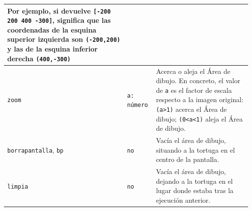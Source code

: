 \begin{center}
\begin{longtable}{|m{3.5cm}|m{3cm}|m{8.5cm}|}
        Por ejemplo, si devuelve \texttt{[-200 200 400 -300]}, significa que
        las coordenadas de la esquina superior izquierda son \texttt{(-200,200)}
        y las de la esquina inferior derecha \texttt{(400,-300)}\\ \hline 
   \texttt{zoom} \index{zoom@\texttt{zoom}} &
      \texttt{a: n\'umero} &
        Acerca o aleja el \'Area de dibujo. En concreto, el valor de \texttt{a}
        es el factor de escala respecto a la imagen original:
        \texttt{(a>1)} acerca el \'Area de dibujo;  
        \texttt{(0<a<1)} aleja el \'Area de dibujo. \\ \hline
   \texttt{borrapantalla}, \index{borrapantalla@\texttt{borrapantalla}}
     \texttt{bp} \index{bp@\texttt{bp}} & \texttt{no} &
        Vac\'ia el \'area de dibujo, situando a la tortuga en el centro de
        la pantalla. \\ \hline 
   \texttt{limpia} \index{limpia@\texttt{limpia}} & \texttt{no} &
        Vac\'ia el \'area de dibujo, dejando a la tortuga en el lugar donde
        estaba tras la ejecuci\'on anterior.\\ \hline 
\end{longtable} \end{center}

